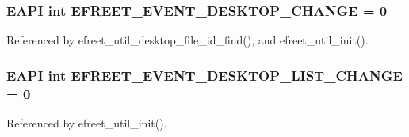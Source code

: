 \subsubsection{\setlength{\rightskip}{0pt plus 5cm}EAPI int {\bf EFREET\_\-EVENT\_\-DESKTOP\_\-CHANGE} = 0}\label{efreet__utils_8c_a55b3b4b6ba75f010ab78a2f581aa043}




Referenced by efreet\_\-util\_\-desktop\_\-file\_\-id\_\-find(), and efreet\_\-util\_\-init().
\subsubsection{\setlength{\rightskip}{0pt plus 5cm}EAPI int {\bf EFREET\_\-EVENT\_\-DESKTOP\_\-LIST\_\-CHANGE} = 0}\label{efreet__utils_8c_e61719e5f6adda1ac511ccecfb56c1cf}




Referenced by efreet\_\-util\_\-init().